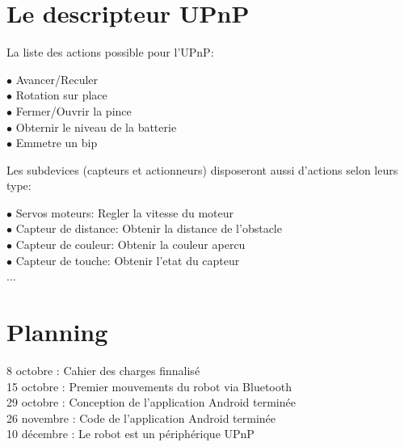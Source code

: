 \documentclass[10pt,a4paper]{article}
\begin{document}
	\section{Le descripteur UPnP}
		La liste des actions possible pour l'UPnP:
		\begin{tabbing}
		$ \bullet $ Avancer/Reculer\\
		$ \bullet $ Rotation sur place\\
		$ \bullet $ Fermer/Ouvrir la pince\\
		$ \bullet $ Obternir le niveau de la batterie\\
		$ \bullet $ Emmetre un bip
		\end{tabbing}
		
		Les subdevices (capteurs et actionneurs) disposeront aussi d'actions selon leurs type:
		\begin{tabbing}
		$ \bullet $	Servos moteurs: Regler la vitesse du moteur\\
		$ \bullet $ Capteur de distance: Obtenir la distance de l'obstacle\\
		$ \bullet $ Capteur de couleur: Obtenir la couleur apercu\\
		$ \bullet $ Capteur de touche: Obtenir l'etat du capteur\\
		...
		\end{tabbing}

	\section{Planning}
		8 octobre : Cahier des charges finnalisé\\
		15 octobre : Premier mouvements du robot via Bluetooth\\
		29 octobre : Conception de l'application Android terminée\\
		26 novembre : Code de l'application Android terminée\\
		10 décembre : Le robot est un périphérique UPnP
\end{document}

